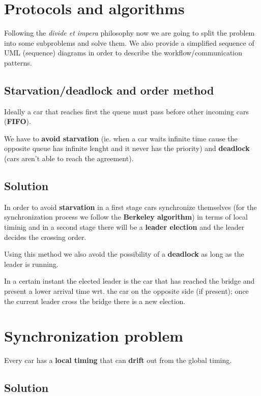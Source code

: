 \section{Protocols and algorithms}

Following the \textit{divide et impera} philosophy now we are going to split the problem 
into some subproblems and solve them. 
We also provide a simplified sequence of UML (sequence) diagrams in order to 
describe the workflow/communication patterns.


\subsection{Starvation/deadlock and order method}

Ideally a car that reaches first the queue must pass before other 
incoming cars (\textbf{FIFO}).

We have to \textbf{avoid starvation} (ie. when a car waits infinite time cause the opposite queue 
has infinite lenght and it never has the priority) and \textbf{deadlock} (cars aren't able to 
reach the agreement). 


\subsection{Solution}

In order to avoid \textbf{starvation} in a first stage cars synchronize themselves 
(for the synchronization process we follow the \textbf{Berkeley algorithm})
in terms of local timinig and in a second stage there will be a \textbf{leader election} 
and the leader decides the crossing order. 

Using this method we also avoid 
the possibility of a \textbf{deadlock} as long as the leader is running.

In a certain instant the elected leader is the car that has reached the bridge and 
present a lower arrival time wrt. the car on the opposite side (if present); 
once the current leader cross the bridge there is a new election.\\


\section{Synchronization problem}

Every car has a \textbf{local timing} that can \textbf{drift} out from the 
global timing. 


\subsection{Solution}

